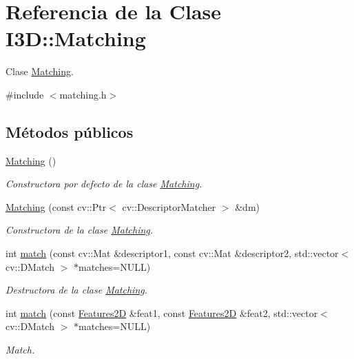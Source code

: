 \hypertarget{class_i3_d_1_1_matching}{}\section{Referencia de la Clase I3D\+:\+:Matching}
\label{class_i3_d_1_1_matching}


Clase \hyperlink{class_i3_d_1_1_matching}{Matching}.  




{\ttfamily \#include $<$matching.\+h$>$}

\subsection*{Métodos públicos}
\begin{DoxyCompactItemize}
\item 
\hyperlink{class_i3_d_1_1_matching_abf5e9d6c507e0aa43e1474027bccd5a7}{Matching} ()
\begin{DoxyCompactList}\small\item\em Constructora por defecto de la clase \hyperlink{class_i3_d_1_1_matching}{Matching}. \end{DoxyCompactList}\item 
\hyperlink{class_i3_d_1_1_matching_a91c7a3c693e2e56ade0c0a3ff953c07e}{Matching} (const cv\+::\+Ptr$<$ cv\+::\+Descriptor\+Matcher $>$ \&dm)
\begin{DoxyCompactList}\small\item\em Constructora de la clase \hyperlink{class_i3_d_1_1_matching}{Matching}. \end{DoxyCompactList}\item 
int \hyperlink{class_i3_d_1_1_matching_a176ab7c3f1992b180bc3e21679f73c8e}{match} (const cv\+::\+Mat \&descriptor1, const cv\+::\+Mat \&descriptor2, std\+::vector$<$ cv\+::\+D\+Match $>$ $\ast$matches=N\+U\+LL)
\begin{DoxyCompactList}\small\item\em Destructora de la clase \hyperlink{class_i3_d_1_1_matching}{Matching}. \end{DoxyCompactList}\item 
int \hyperlink{class_i3_d_1_1_matching_ac224c143ddb327a0b31dddfd066f262d}{match} (const \hyperlink{class_i3_d_1_1_features2_d}{Features2D} \&feat1, const \hyperlink{class_i3_d_1_1_features2_d}{Features2D} \&feat2, std\+::vector$<$ cv\+::\+D\+Match $>$ $\ast$matches=N\+U\+LL)
\begin{DoxyCompactList}\small\item\em Match. \end{DoxyCompactList}\item 

\end{DoxyCompactItemize}
